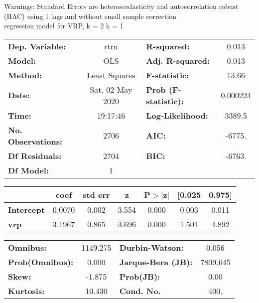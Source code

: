 Warnings: \newline
 [1] Standard Errors are heteroscedasticity and autocorrelation robust (HAC) using 1 lags and without small sample correction\\ 

regression model for VRP, k = 2 h = 1\begin{center}
\begin{tabular}{lclc}
\toprule
\textbf{Dep. Variable:}    &       rtrn       & \textbf{  R-squared:         } &     0.013   \\
\textbf{Model:}            &       OLS        & \textbf{  Adj. R-squared:    } &     0.013   \\
\textbf{Method:}           &  Least Squares   & \textbf{  F-statistic:       } &     13.66   \\
\textbf{Date:}             & Sat, 02 May 2020 & \textbf{  Prob (F-statistic):} &  0.000224   \\
\textbf{Time:}             &     19:17:46     & \textbf{  Log-Likelihood:    } &    3389.5   \\
\textbf{No. Observations:} &        2706      & \textbf{  AIC:               } &    -6775.   \\
\textbf{Df Residuals:}     &        2704      & \textbf{  BIC:               } &    -6763.   \\
\textbf{Df Model:}         &           1      & \textbf{                     } &             \\
\bottomrule
\end{tabular}
\begin{tabular}{lcccccc}
                   & \textbf{coef} & \textbf{std err} & \textbf{z} & \textbf{P$> |$z$|$} & \textbf{[0.025} & \textbf{0.975]}  \\
\midrule
\textbf{Intercept} &       0.0070  &        0.002     &     3.554  &         0.000        &        0.003    &        0.011     \\
\textbf{vrp}       &       3.1967  &        0.865     &     3.696  &         0.000        &        1.501    &        4.892     \\
\bottomrule
\end{tabular}
\begin{tabular}{lclc}
\textbf{Omnibus:}       & 1149.275 & \textbf{  Durbin-Watson:     } &    0.056  \\
\textbf{Prob(Omnibus):} &   0.000  & \textbf{  Jarque-Bera (JB):  } & 7809.645  \\
\textbf{Skew:}          &  -1.875  & \textbf{  Prob(JB):          } &     0.00  \\
\textbf{Kurtosis:}      &  10.430  & \textbf{  Cond. No.          } &     400.  \\
\bottomrule
\end{tabular}
\end{center}


